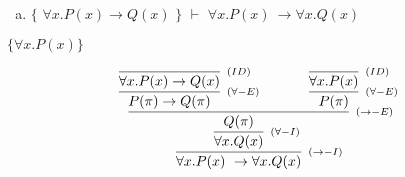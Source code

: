 \documentclass[aspectratio=43]{beamer}
\begin{document}
     \begin{frame}[fragile]
    
    	\begin{enumerate}[f)]
			\item $\{$ $\forall x.P(x)\to Q(x) $ $\}$ $\vdash$ $ \forall x.P(x)\ \to \forall x.Q(x) $ \\
		\end{enumerate}
        $ \{\forall x.P(x)\} $
        \vspace{40pt}
        
        \[
        \begin{array}{c}
		
        	\infer[_{(\to -I)}]
            	{\forall x.P(x)\ \to \forall x.Q(x)}
            	{\infer[_{(\forall -I)}] 
                	{\forall x.Q(x)}
                    {\infer[_{(\to -E)}]
                    	{Q(\pi)}
                        {\infer[_{(\forall -E)}]
                        	{P(\pi)\rightarrow Q(\pi)}
                            {\infer[_{(ID)}]
                            	{\forall x.P(x)\to Q(x)}
                            	{}
                            }
                        \hspace{35pt} 
                        \infer[_{(\forall -E)}] 
                        	{P(\pi)}
                            {\infer[_{(ID)}]
                            	{\forall x.P(x)}
                                {}
                            }
                        }
                    }
                 }   
        
		\end{array}
        \]
        
	\end{frame}
    
    
\end{document}
